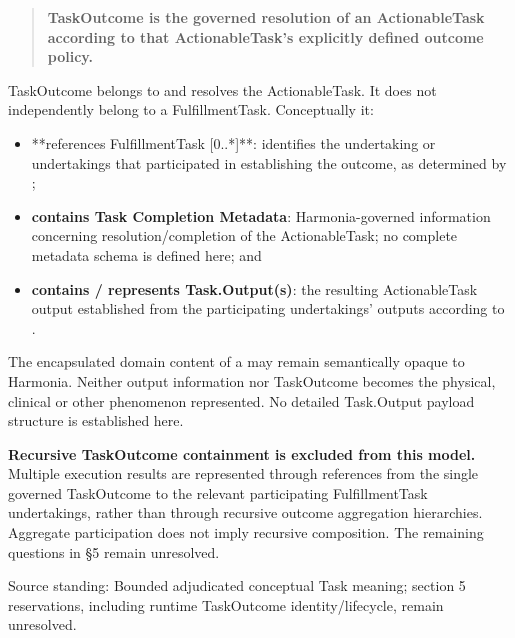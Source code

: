 \begin{quote}


\textbf{TaskOutcome is the governed resolution of an ActionableTask according to
that ActionableTask's explicitly defined outcome policy.}



\end{quote}


TaskOutcome belongs to and resolves the ActionableTask. It does not
independently belong to a FulfillmentTask. Conceptually it:



\begin{itemize}


\item **references FulfillmentTask [0..*]**: identifies the undertaking or
  undertakings that participated in establishing the outcome, as determined
  by \texttt{};

\item \textbf{contains Task Completion Metadata}: Harmonia-governed information
  concerning resolution/completion of the ActionableTask; no complete
  metadata schema is defined here; and

\item \textbf{contains / represents Task.Output(s)}: the resulting ActionableTask
  output established from the participating undertakings' outputs according
  to \texttt{}.

\end{itemize}


The encapsulated domain content of a \texttt{} may remain semantically
opaque to Harmonia. Neither output information nor TaskOutcome becomes the
physical, clinical or other phenomenon represented. No detailed Task.Output
payload structure is established here.



\textbf{Recursive TaskOutcome containment is excluded from this model.} Multiple
execution results are represented through references from the single
governed TaskOutcome to the relevant participating FulfillmentTask
undertakings, rather than through recursive outcome aggregation hierarchies.
Aggregate participation does not imply recursive composition. The remaining
questions in §5 remain unresolved.



Source standing: Bounded adjudicated conceptual Task meaning; section 5 reservations, including runtime TaskOutcome identity/lifecycle, remain unresolved.



